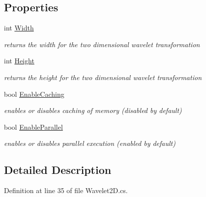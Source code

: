 \subsection*{\-Properties}
\begin{DoxyCompactItemize}
\item 
int \hyperlink{class_turbo_wavelets_1_1_wavelet2_d_a30058c5e0e5bd95b29bc080efbcf9083}{\-Width}
\begin{DoxyCompactList}\small\item\em returns the width for the two dimensional wavelet transformation \end{DoxyCompactList}\item 
int \hyperlink{class_turbo_wavelets_1_1_wavelet2_d_a277d0f89d73f839350c64a83ccd76ff6}{\-Height}
\begin{DoxyCompactList}\small\item\em returns the height for the two dimensional wavelet transformation \end{DoxyCompactList}\item 
bool \hyperlink{class_turbo_wavelets_1_1_wavelet2_d_abbd41e51d24f8a7912ae47dd364ed4fb}{\-Enable\-Caching}
\begin{DoxyCompactList}\small\item\em enables or disables caching of memory (disabled by default) \end{DoxyCompactList}\item 
bool \hyperlink{class_turbo_wavelets_1_1_wavelet2_d_abec21e54c6ab8cce0e02ef3ad64ae5af}{\-Enable\-Parallel}
\begin{DoxyCompactList}\small\item\em enables or disables parallel execution (enabled by default) \end{DoxyCompactList}\end{DoxyCompactItemize}


\subsection{\-Detailed \-Description}


\-Definition at line 35 of file \-Wavelet2\-D.\-cs.




